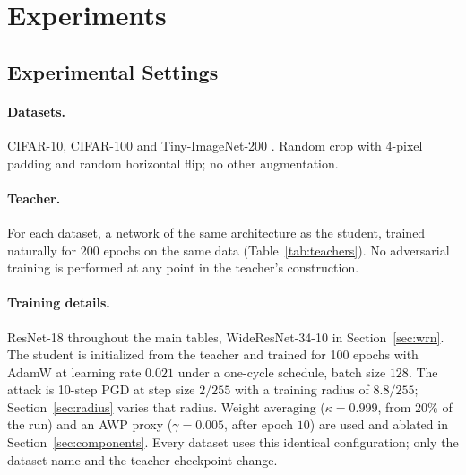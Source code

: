 %

\section{Experiments}
\label{sec:exp}

\subsection{Experimental Settings}

\paragraph{Datasets.} CIFAR-10, CIFAR-100 \citep{krizhevsky2009learning} and Tiny-ImageNet-200
\citep{le2015tiny}. Random crop with 4-pixel padding and random horizontal flip; no other
augmentation.

\paragraph{Teacher.} For each dataset, a network of the same architecture as the student, trained
naturally for 200 epochs on the same data (Table~\ref{tab:teachers}). No adversarial training is
performed at any point in the teacher's construction.

\paragraph{Training details.} ResNet-18 throughout the main tables, WideResNet-34-10 in
Section~\ref{sec:wrn}. The student is initialized from the teacher and trained for 100 epochs with
AdamW at learning rate $0.021$ under a one-cycle schedule, batch size $128$. The attack is 10-step PGD
at step size $2/255$ with a training radius of $8.8/255$; Section~\ref{sec:radius} varies that radius.
Weight averaging ($\kappa=0.999$, from $20\%$ of the run) and an AWP proxy \citep{wu2020adversarial}
($\gamma=0.005$, after epoch $10$) are used and ablated in Section~\ref{sec:components}. Every dataset
uses this identical configuration; only the dataset name and the teacher checkpoint change.

